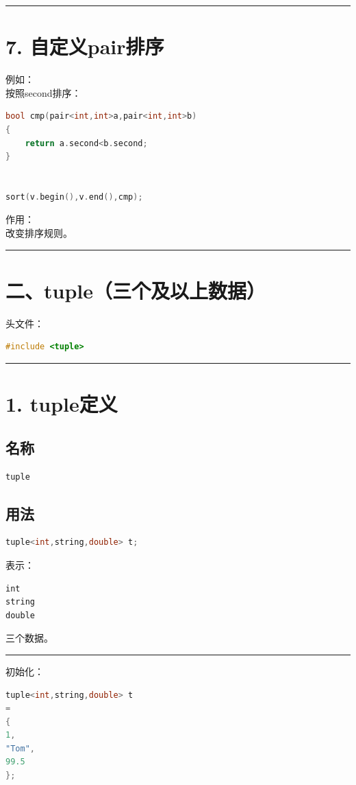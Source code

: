 \documentclass[10pt,twocolumn]{extarticle}
\begin{document}
\noindent\rule{\linewidth}{0.4pt}

\section{7. 自定义pair排序}

例如：\\
按照second排序：
\begin{lstlisting}[language=C++]
bool cmp(pair<int,int>a,pair<int,int>b)
{
    return a.second<b.second;
}


sort(v.begin(),v.end(),cmp);
\end{lstlisting}
作用：\\
改变排序规则。

\noindent\rule{\linewidth}{0.4pt}

\section{二、tuple（三个及以上数据）}

头文件：
\begin{lstlisting}[language=C++]
#include <tuple>
\end{lstlisting}

\noindent\rule{\linewidth}{0.4pt}

\section{1. tuple定义}

\subsection{名称}
\begin{lstlisting}[language=C++]
tuple
\end{lstlisting}

\subsection{用法}
\begin{lstlisting}[language=C++]
tuple<int,string,double> t;
\end{lstlisting}
表示：
\begin{lstlisting}
int
string
double
\end{lstlisting}
三个数据。

\noindent\rule{\linewidth}{0.4pt}

初始化：
\begin{lstlisting}[language=C++]
tuple<int,string,double> t
=
{
1,
"Tom",
99.5
};
\end{lstlisting}
\end{document}
